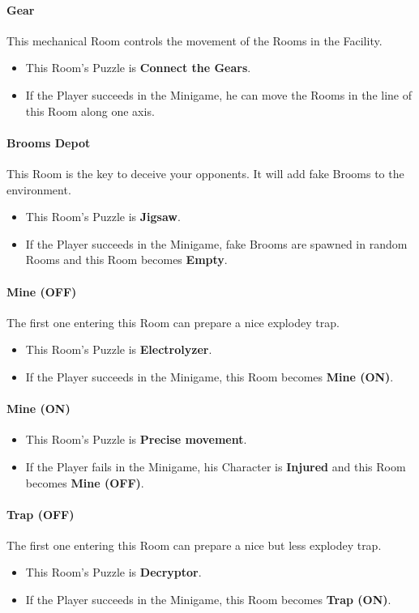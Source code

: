 \paragraph{Gear} This mechanical Room controls the movement of the Rooms in the Facility.
\begin{itemize}
	\item This Room's Puzzle is \textbf{Connect the Gears}.
	\item If the Player succeeds in the Minigame, he can move the Rooms in the line of this Room along one axis.
\end{itemize}

\paragraph{Brooms Depot} This Room is the key to deceive your opponents. It will add fake Brooms to the environment.
\begin{itemize}
	\item This Room's Puzzle is \textbf{Jigsaw}.
	\item If the Player succeeds in the Minigame, fake Brooms are spawned in random Rooms and this Room becomes \textbf{Empty}.
\end{itemize}

\paragraph{Mine (OFF)} The first one entering this Room can prepare a nice explodey trap.
\begin{itemize}
	\item This Room's Puzzle is \textbf{Electrolyzer}.
	\item If the Player succeeds in the Minigame, this Room becomes \textbf{Mine (ON)}.
\end{itemize}

\paragraph{Mine (ON)}
\begin{itemize}
	\item This Room's Puzzle is \textbf{Precise movement}.
	\item If the Player fails    in the Minigame, his Character is \textbf{Injured} and this Room becomes \textbf{Mine (OFF)}.
\end{itemize}

\paragraph{Trap (OFF)} The first one entering this Room can prepare a nice but less explodey trap.
\begin{itemize}
	\item This Room's Puzzle is \textbf{Decryptor}.
	\item If the Player succeeds in the Minigame, this Room becomes \textbf{Trap (ON)}.
\end{itemize}

